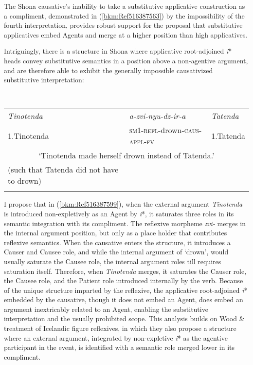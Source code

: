 \documentclass[output=paper,modfonts,nonflat]{langsci/langscibook}
\begin{document}
The Shona causative’s inability to take a substitutive applicative construction as a compliment, demonstrated in (\ref{bkm:Ref516387563}) by the impossibility of the fourth interpretation, provides robust support for the proposal that substitutive applicatives embed Agents and merge at a higher position than high applicatives. 



Intriguingly, there is a structure in Shona where applicative root-adjoined \textit{i}* heads convey substitutive semantics in a position above a non-agentive argument, and are therefore able to exhibit the generally impossible causativized substitutive interpretation:


\ea\label{ex:key:}
{}\\
\z


\begin{tabularx}{\textwidth}{XXX}
\lsptoprule
{\itshape Tinotenda}  & \textit{a-zvi-nyu-dz-ir-a} & \textit{Tatenda}\\
1.Tinotenda & \textsc{sm1-refl-}drown\textsc{{}-caus-appl-fv} & 1.Tatenda\\
\multicolumn{3}{c}{‘Tinotenda made herself drown instead of Tatenda.’}\\
(such that Tatenda did not have to drown)\\
\lspbottomrule
\end{tabularx}


I propose that in (\ref{bkm:Ref516387599}), when the external argument \textit{Tinotenda} is introduced non-expletively as an Agent by \textit{i}*, it saturates three roles in its semantic integration with its compliment. The reflexive morpheme \textit{zvi-} merges in the internal argument position, but only as a place holder that contributes reflexive semantics. When the causative enters the structure, it introduces a Causer and Causee role, and while the internal argument of ‘drown’, would usually saturate the Causee role, the internal argument roles till requires saturation itself. Therefore, when \textit{Tinotenda} merges, it saturates the Causer role, the Causee role, and the Patient role introduced internally by the verb. Because of the unique structure imparted by the reflexive, the applicative root-adjoined \textit{i}* embedded by the causative, though it does not embed an Agent, does embed an argument inextricably related to an Agent, enabling the substitutive interpretation and the usually prohibited scope. This analysis builds on Wood \&  treatment of Icelandic figure reflexives, in which they also propose a structure where an external argument, integrated by non-expletive \textit{i}* as the agentive participant in the event, is identified with a semantic role merged lower in its compliment. 
\end{document}
